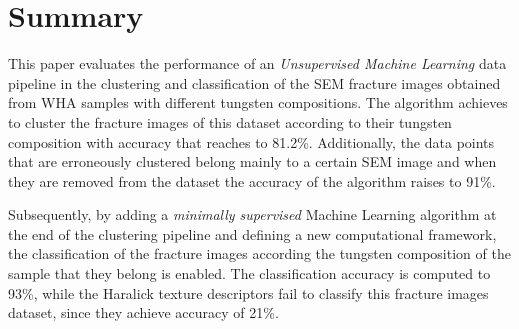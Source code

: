 \documentclass[authoryear,preprint,review,12pt, singleside]{elsarticle}
\begin{document}
  

\section*{Summary}
\label{conclusions_label}

This paper evaluates the performance of an \textit{Unsupervised Machine Learning} data pipeline in the clustering and classification of the SEM fracture images obtained from WHA samples with different tungsten compositions. The algorithm achieves to cluster the fracture images of this dataset according to their tungsten composition with accuracy that reaches to 81.2\%. Additionally, the data points that are erroneously clustered belong mainly to a certain SEM image and when they are removed from the dataset the accuracy of the algorithm raises to 91\%. 

Subsequently, by adding a \textit{minimally supervised} Machine Learning algorithm at the end of the clustering pipeline and defining a new computational framework, the classification of the fracture images according the tungsten composition of the sample that they belong is enabled. The classification accuracy is computed to 93\%, while the Haralick texture descriptors fail to classify this fracture images dataset, since they achieve accuracy of 21\%. 
\end{document}
